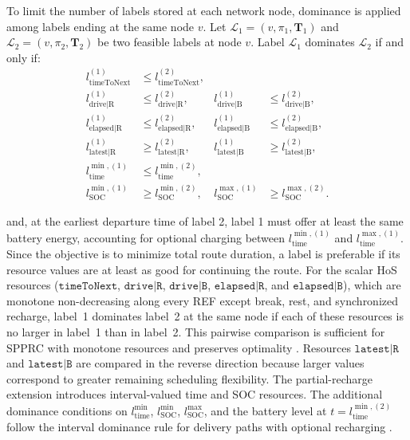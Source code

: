 \documentclass[3p,11pt,authoryear]{elsarticle}  %
\begin{document}
To limit the number of labels stored at each network node, dominance is applied among labels ending at the same node $v$. Let $\mathcal{L}_1=(v,\pi_1,\mathbf{T}_1)$ and $\mathcal{L}_2=(v,\pi_2,\mathbf{T}_2)$ be two feasible labels at node $v$. Label $\mathcal{L}_1$ dominates $\mathcal{L}_2$ if and only if:
\begin{align*}
l_{\text{timeToNext}}^{(1)} &\le l_{\text{timeToNext}}^{(2)}, \\
l_{\text{drive|R}}^{(1)} &\le l_{\text{drive|R}}^{(2)}, &
l_{\text{drive|B}}^{(1)} &\le l_{\text{drive|B}}^{(2)}, \\
l_{\text{elapsed|R}}^{(1)} &\le l_{\text{elapsed|R}}^{(2)}, &
l_{\text{elapsed|B}}^{(1)} &\le l_{\text{elapsed|B}}^{(2)}, \\
l_{\text{latest|R}}^{(1)} &\ge l_{\text{latest|R}}^{(2)}, &
l_{\text{latest|B}}^{(1)} &\ge l_{\text{latest|B}}^{(2)}, \\
l_{\text{time}}^{\min,(1)} &\le l_{\text{time}}^{\min,(2)}, \\
l_{\text{SOC}}^{\min,(1)} &\ge l_{\text{SOC}}^{\min,(2)}, &
l_{\text{SOC}}^{\max,(1)} &\ge l_{\text{SOC}}^{\max,(2)}.
\end{align*}

and, at the earliest departure time of label 2, label 1 must offer at least the same battery energy, accounting for optional charging between $l_{\text{time}}^{\min,(1)}$ and $l_{\text{time}}^{\max,(1)}$.  Since the objective is to minimize total route duration, a label is preferable if its resource values are at least as good for continuing the route. For the scalar HoS resources ($\texttt{timeToNext}$, $\texttt{drive|R}$, $\texttt{drive|B}$,
$\texttt{elapsed|R}$, and $\texttt{elapsed|B}$), which are monotone non-decreasing along every REF except break, rest, and synchronized recharge, label~1 dominates label~2 at the same node if each of these resources is no
larger in label~1 than in label~2. This pairwise comparison is sufficient for SPPRC with monotone resources and
preserves optimality \citep{irnich2005shortest, goel2017exact}. Resources $\texttt{latest|R}$ and $\texttt{latest|B}$ are compared in the reverse direction because larger values correspond to greater remaining scheduling flexibility. The partial-recharge extension introduces interval-valued time and SOC resources. The additional dominance conditions on $l_{\text{time}}^{\min}$, $l_{\text{SOC}}^{\min}$, $l_{\text{SOC}}^{\max}$, and the battery level at $t=l_{\text{time}}^{\min,(2)}$ follow the interval dominance rule for delivery paths with optional recharging
\citep{desaulniers2016exact}.
\end{document}
